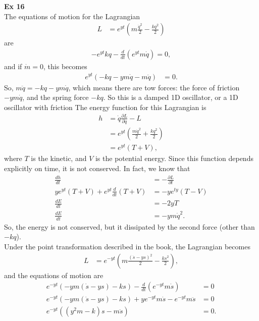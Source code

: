 \documentclass[10pt]{article}
\begin{document}
\textbf{Ex 16}\\
The equations of motion for the Lagrangian 
\begin{align*}
  L &= e^{yt}\left( m\frac{\dot q^2}{2}-\frac{kq^2}{2} \right)
\end{align*}
are
\begin{align*}
  -e^{yt}kq - \frac{d}{dt}(e^{yt} m\dot q)=0,
\end{align*}
and if $\dot m=0$, this becomes
\begin{align*}
  e^{yt}\left( -kq-ym\dot q-m\ddot q \right) &= 0.
\end{align*}
So, $m\ddot q = -kq-ym\dot q$, which means there are tow forces:
the force of friction $-ym\dot q$, and the spring force $-kq$.
So this is a damped 1D oscillator, or a 1D oscillator with friction
The energy function for this Lagrangian is
\begin{align*}
  h &= \dot q\frac{\partial L}{\partial \dot q}-L\\
    &= e^{yt}\left( \frac{m\dot q^2}{2}+\frac{kq^2}{2} \right)\\
    &= e^{yt}\left( T+V \right),
\end{align*}
where $T$ is the kinetic, and $V$ is the potential energy.  Since this function
depends explicitly on time, it is not conserved.  In fact, we know that
\begin{align*}
  \frac{dh}{dt} &= -\frac{\partial L}{\partial t}\\
  ye^{yt}\left( T+V \right) +e^{yt}\frac{d}{dt}\left( T+V \right)  &= -ye^{ty}\left( T-V \right)\\
  \frac{dE}{dt} &= -2yT\\
  \frac{dE}{dt} &= -ym\dot q^2.
\end{align*}
So, the energy is not conserved, but it dissipated by the second force 
(other than $-kq$).\\
Under the point transformation described in the book, the Lagrangian becomes
\begin{align*}
  L &= e^{-yt}\left( m\frac{(\dot s -ys)^2}{2}-\frac{ks^2}{2} \right),
\end{align*}
and the equations of motion are
\begin{align*}
  e^{-yt}\left( -ym(\dot s-ys)-ks \right) - \frac{d}{dt}\left( e^{-yt}m\dot s \right) &= 0\\
  e^{-yt}\left( -ym(\dot s-ys)-ks \right) +  ye^{-yt}m\dot s - e^{-yt}m\ddot s &= 0\\
  e^{-yt}\left( (y^2m-k)s - m\ddot s \right)  &= 0.
\end{align*}
\end{document}
